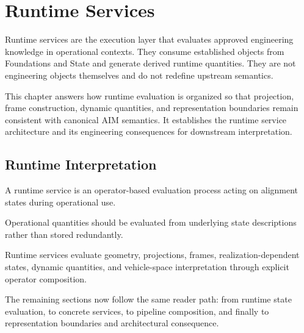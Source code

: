 
\chapter{Runtime Services}

\label{chap:runtime-services}


Runtime services are the execution layer that evaluates approved
engineering knowledge in operational contexts. They consume established
objects from Foundations and State and generate derived runtime
quantities. They are not engineering objects themselves and do not
redefine upstream semantics.

This chapter answers how runtime evaluation is organized so that
projection, frame construction, dynamic quantities, and representation
boundaries remain consistent with canonical AIM semantics. It
establishes the runtime service architecture and its engineering
consequences for downstream interpretation.

\section{Runtime Interpretation}

\begin{definition}
\label{def:runtime-service}
A runtime service is an operator-based evaluation process acting on
alignment states during operational use.
\end{definition}

\begin{principle}
\label{princ:runtime-evaluation}
Operational quantities should be evaluated from underlying state
descriptions rather than stored redundantly.
\end{principle}

Runtime services evaluate geometry, projections, frames,
realization-dependent states, dynamic quantities, and vehicle-space
interpretation through explicit operator composition.

The remaining sections now follow the same reader path: from runtime
state evaluation, to concrete services, to pipeline composition, and
finally to representation boundaries and architectural consequence.

